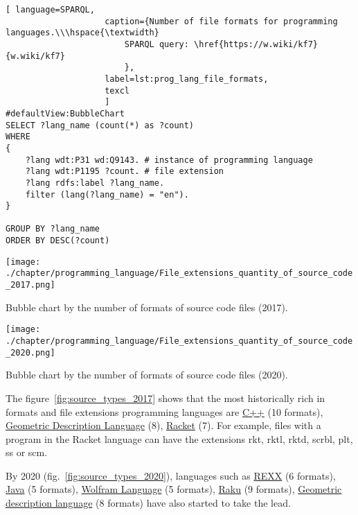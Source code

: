 \begin{lstlisting}[ language=SPARQL, 
                    caption={Number of file formats for programming languages.\\\hspace{\textwidth}
                        SPARQL query: \href{https://w.wiki/kf7}{w.wiki/kf7}
                        },
                    label=lst:prog_lang_file_formats,
                    texcl 
                    ]
#defaultView:BubbleChart
SELECT ?lang_name (count(*) as ?count)
WHERE
{
    ?lang wdt:P31 wd:Q9143. # instance of programming language
  	?lang wdt:P1195 ?count. # file extension
  	?lang rdfs:label ?lang_name.
    filter (lang(?lang_name) = "en").
}

GROUP BY ?lang_name 
ORDER BY DESC(?count)
\end{lstlisting}%

\begin{marginfigure}[-15cm]
	\texttt{[image: ./chapter/programming\_language/File\_extensions\_quantity\_of\_source\_code\_2017.png]}
	\caption{Bubble chart by the number of formats of source code files (2017).}
	\label{fig:source_types_2017}
\end{marginfigure}
\begin{marginfigure}[-3cm]
	\texttt{[image: ./chapter/programming\_language/File\_extensions\_quantity\_of\_source\_code\_2020.png]}
	\caption{Bubble chart by the number of formats of source code files (2020).}
	\label{fig:source_types_2020}
\end{marginfigure}

The figure~\ref{fig:source_types_2017} shows that the most historically rich in formats and file extensions programming languages are \href{https://en.wikipedia.org/wiki/C\%2B\%2B}{C++} (10 formats), \href{https://en.wikipedia.org/wiki/Geometric_Description_Language}{Geometric Description Language} (8), \href{https://en.wikipedia.org/wiki/Racket}{Racket} (7). For example, files with a program in the Racket language can have the extensions rkt, rktl, rktd, scrbl, plt, ss or scm.

By 2020 (fig.~\ref{fig:source_types_2020}), languages such as  \href{https://en.wikipedia.org/wiki/REXX}{REXX} (6 formats), \href{https://en.wikipedia.org/wiki/Java_(programming_language)}{Java} (5 formats), \href{https://en.wikipedia.org/wiki/Wolfram_Language}{Wolfram Language} (5 formats), \href{https://en.wikipedia.org/wiki/Raku_(programming_language)}{Raku} (9 formats), \href{https://en.wikipedia.org/wiki/Geometric_Description_Language}{Geometric description language} (8 formats) have also started to take the lead.

